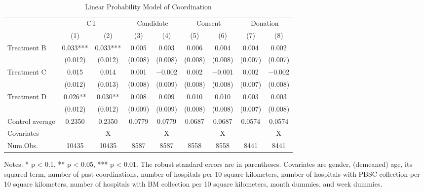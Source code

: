 \documentclass[
  11pt,
  a4paper
]{article}
\begin{document}
\begin{table}

\caption{\label{tab:est-full-coordination}Linear Probability Model of Coordination}
\centering
\fontsize{9}{11}\selectfont
\begin{threeparttable}
\begin{tabular}[t]{lcccccccc}
\toprule
\multicolumn{1}{c}{ } & \multicolumn{2}{c}{CT} & \multicolumn{2}{c}{Candidate} & \multicolumn{2}{c}{Consent} & \multicolumn{2}{c}{Donation} \\
\cmidrule(l{3pt}r{3pt}){2-3} \cmidrule(l{3pt}r{3pt}){4-5} \cmidrule(l{3pt}r{3pt}){6-7} \cmidrule(l{3pt}r{3pt}){8-9}
  & (1) & (2) & (3) & (4) & (5) & (6) & (7) & (8)\\
\midrule
Treatment B & \num{0.033}*** & \num{0.033}*** & \num{0.005} & \num{0.003} & \num{0.006} & \num{0.004} & \num{0.004} & \num{0.002}\\
 & (\num{0.012}) & (\num{0.012}) & (\num{0.008}) & (\num{0.008}) & (\num{0.008}) & (\num{0.008}) & (\num{0.007}) & (\num{0.007})\\
Treatment C & \num{0.015} & \num{0.014} & \num{0.001} & \num{-0.002} & \num{0.002} & \num{-0.001} & \num{0.002} & \num{-0.002}\\
 & (\num{0.012}) & (\num{0.013}) & (\num{0.008}) & (\num{0.009}) & (\num{0.008}) & (\num{0.008}) & (\num{0.007}) & (\num{0.008})\\
Treatment D & \num{0.026}** & \num{0.030}** & \num{0.008} & \num{0.009} & \num{0.010} & \num{0.010} & \num{0.003} & \num{0.003}\\
 & (\num{0.012}) & (\num{0.012}) & (\num{0.009}) & (\num{0.009}) & (\num{0.008}) & (\num{0.008}) & (\num{0.007}) & (\num{0.008})\\
\midrule
Control average & 0.2350 & 0.2350 & 0.0779 & 0.0779 & 0.0687 & 0.0687 & 0.0574 & 0.0574\\
Covariates &  & X &  & X &  & X &  & X\\
Num.Obs. & \num{10435} & \num{10435} & \num{8587} & \num{8587} & \num{8558} & \num{8558} & \num{8441} & \num{8441}\\
\bottomrule
\end{tabular}
\begin{tablenotes}
\item Notes: * p < 0.1, ** p < 0.05, *** p < 0.01. The robust standard errors are in parentheses. Covariates are gender, (demeaned) age, its squared term, number of past coordinations, number of hospitals per 10 square kilometers, number of hospitals with PBSC collection per 10 square kilometers, number of hospitals with BM collection per 10 square kilometers, month dummies, and week dummies.
\end{tablenotes}
\end{threeparttable}
\end{table}
\end{document}
